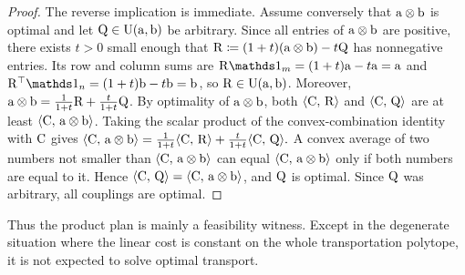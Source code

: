 \begin{proof}
The reverse implication is immediate. Assume conversely that $\mathrm{a}\otimes\mathrm{b}$ is optimal and let $\mathrm{Q}\in\mathrm{U}(\mathrm{a},\mathrm{b})$ be arbitrary. Since all entries of $\mathrm{a}\otimes\mathrm{b}$ are positive, there exists $t>0$ small enough that
\(\mathrm{R}\coloneqq (1+t)(\mathrm{a}\otimes\mathrm{b})-t\mathrm{Q}\)
has nonnegative entries. Its row and column sums are $\R\ones_m=(1+t)\a-t\a=\a$ and $\R^\top\ones_n=(1+t)\b-t\b=\b$, so $\mathrm{R}\in\mathrm{U}(\mathrm{a},\mathrm{b})$. Moreover,
\(\mathrm{a}\otimes\mathrm{b}=\frac{1}{1+t}\mathrm{R}+\frac{t}{1+t}\mathrm{Q}\).
By optimality of $\mathrm{a}\otimes\mathrm{b}$, both $\langle \mathrm{C},\,\mathrm{R}\rangle$ and $\langle \mathrm{C},\,\mathrm{Q}\rangle$ are at least $\langle \mathrm{C},\,\mathrm{a}\otimes\mathrm{b}\rangle$. Taking the scalar product of the convex-combination identity with $\mathrm{C}$ gives
\(\langle \mathrm{C},\,\mathrm{a}\otimes\mathrm{b}\rangle = \frac{1}{1+t}\langle \mathrm{C},\,\mathrm{R}\rangle +\frac{t}{1+t}\langle \mathrm{C},\,\mathrm{Q}\rangle.\)
A convex average of two numbers not smaller than $\langle \mathrm{C},\,\mathrm{a}\otimes\mathrm{b}\rangle$ can equal $\langle \mathrm{C},\,\mathrm{a}\otimes\mathrm{b}\rangle$ only if both numbers are equal to it. Hence $\langle \mathrm{C},\,\mathrm{Q}\rangle=\langle \mathrm{C},\,\mathrm{a}\otimes\mathrm{b}\rangle$, and $\mathrm{Q}$ is optimal. Since $\mathrm{Q}$ was arbitrary, all couplings are optimal.
\end{proof}
Thus the product plan is mainly a feasibility witness. Except in the degenerate situation where the linear cost is constant on the whole transportation polytope, it is not expected to solve optimal transport.

